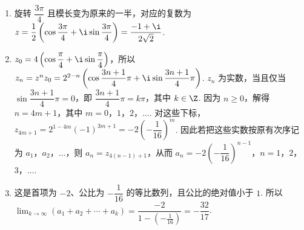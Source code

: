 \documentclass[UTF8,a4paper,oneside,11pt]{ctexbook}
\begin{document}
\begin{solution}
\begin{enumerate}
\item 旋转 \(\dfrac{3\pi}{4}\) 且模长变为原来的一半，对应的复数为
\(z=\dfrac12\left(\cos\dfrac{3\pi}{4}+\i\sin\dfrac{3\pi}{4}\right)=\dfrac{-1+\i}{2\sqrt2}\).
\item \(z_0=4\left(\cos\dfrac\pi4+\i\sin\dfrac\pi4\right)\)，所以
\(z_n=z^nz_0=2^{2-n}\left(\cos\dfrac{3n+1}{4}\pi+\i\sin\dfrac{3n+1}{4}\pi\right)\).
\(z_n\) 为实数，当且仅当 \(\sin\dfrac{3n+1}{4}\pi=0\)，即 \(\dfrac{3n+1}{4}\pi=k\pi\)，其中 \(k\in\Z\). 因为 \(n\geqslant0\)，解得 \(n=4m+1\)，其中 \(m=0\)，\(1\)，\(2\)，\(\dots\). 对这些下标，
\(z_{4m+1}=2^{1-4m}(-1)^{3m+1}=-2\left(-\dfrac1{16}\right)^m\).
因此若把这些实数按原有次序记为 \(a_1\)，\(a_2\)，\(\dots\)，则 \(a_n=z_{4(n-1)+1}\)，从而
\(a_n=-2\left(-\dfrac1{16}\right)^{n-1}\)，\(n=1\)，\(2\)，\(3\)，\(\dots\).
\item 这是首项为 \(-2\)、公比为 \(-\dfrac1{16}\) 的等比数列，且公比的绝对值小于 \(1\). 所以
\(\displaystyle\lim_{k\to\infty}(a_1+a_2+\cdots+a_k)=\dfrac{-2}{1-\left(-\frac1{16}\right)}=-\dfrac{32}{17}\).
\end{enumerate}
\end{solution}


\end{document}
